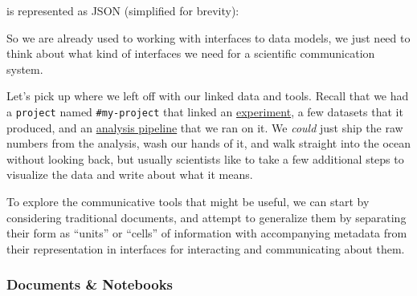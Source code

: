 is represented as JSON (simplified for brevity):

\begin{Shaded}
\begin{Highlighting}[]
\FunctionTok{\{}
  \FunctionTok{:} \FunctionTok{,}
  \FunctionTok{:} \FunctionTok{,}
  \FunctionTok{:} \OtherTok{[}\FunctionTok{\{}
    \FunctionTok{:} \FunctionTok{,}
    \FunctionTok{:} \FunctionTok{,}
    \FunctionTok{:} \OtherTok{[}
    \OtherTok{]}
  \FunctionTok{\}}\OtherTok{]}\FunctionTok{,}
  \FunctionTok{:} \OtherTok{[}
    \OtherTok{,}
  \OtherTok{]}
\FunctionTok{\}}
\end{Highlighting}
\end{Shaded}

So we are already used to working with interfaces to data models, we
just need to think about what kind of interfaces we need for a
scientific communication system.

Let's pick up where we left off with our linked data and tools. Recall
that we had a \texttt{project} named \texttt{\#my-project} that linked
an \protect\hyperlink{myproject-experiment}{experiment}, a few datasets
that it produced, and an \protect\hyperlink{myproject-analysis}{analysis
pipeline} that we ran on it. We \emph{could} just ship the raw numbers
from the analysis, wash our hands of it, and walk straight into the
ocean without looking back, but usually scientists like to take a few
additional steps to visualize the data and write about what it means.

To explore the communicative tools that might be useful, we can start by
considering traditional documents, and attempt to generalize them by
separating their form as ``units'' or ``cells'' of information with
accompanying metadata from their representation in interfaces for
interacting and communicating about them.

\hypertarget{documents-notebooks}{%
\subsubsection{Documents \& Notebooks}\label{documents-notebooks}}

